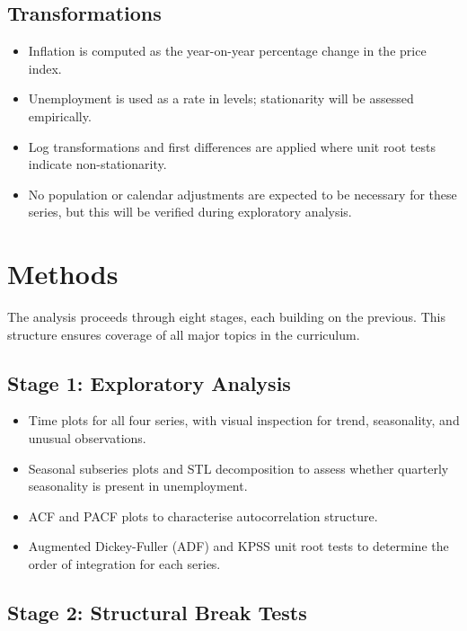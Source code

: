 \subsection{Transformations}

\begin{itemize}[nosep]
    \item Inflation is computed as the year-on-year percentage change in the
          price index.
    \item Unemployment is used as a rate in levels; stationarity will be
          assessed empirically.
    \item Log transformations and first differences are applied where unit root
          tests indicate non-stationarity.
    \item No population or calendar adjustments are expected to be necessary
          for these series, but this will be verified during exploratory
          analysis.
\end{itemize}

\section{Methods}

The analysis proceeds through eight stages, each building on the previous.
This structure ensures coverage of all major topics in the curriculum.

\subsection{Stage 1: Exploratory Analysis}

\begin{itemize}[nosep]
    \item Time plots for all four series, with visual inspection for trend,
          seasonality, and unusual observations.
    \item Seasonal subseries plots and STL decomposition to assess whether
          quarterly seasonality is present in unemployment.
    \item ACF and PACF plots to characterise autocorrelation structure.
    \item Augmented Dickey-Fuller (ADF) and KPSS unit root tests to determine
          the order of integration for each series.
\end{itemize}

\subsection{Stage 2: Structural Break Tests}

